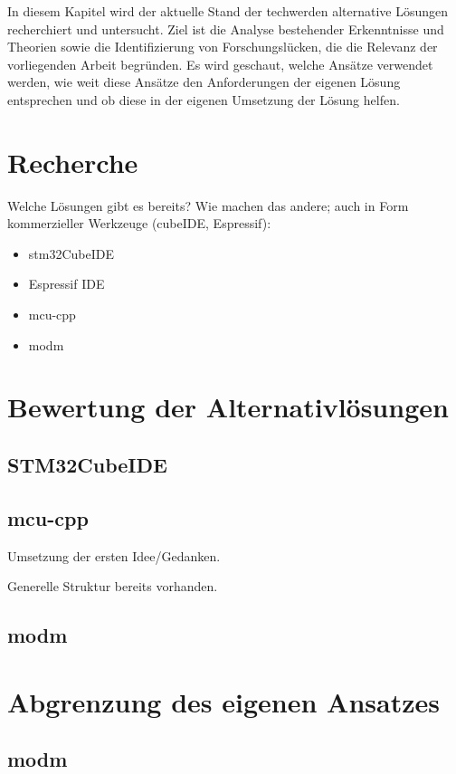 In diesem Kapitel wird der aktuelle Stand der techwerden alternative Lösungen recherchiert und untersucht.
Ziel ist die Analyse bestehender Erkenntnisse und Theorien sowie die Identifizierung von Forschungslücken, die die Relevanz der vorliegenden Arbeit begründen.
Es wird geschaut, welche Ansätze verwendet werden, wie weit diese Ansätze den Anforderungen der eigenen Lösung entsprechen und ob diese in der eigenen Umsetzung der Lösung helfen.



\section{Recherche}
Welche Lösungen gibt es bereits?
Wie machen das andere; auch in Form kommerzieller Werkzeuge (cubeIDE, Espressif):
\begin{itemize}
	\item stm32CubeIDE
	\item Espressif IDE
	\item mcu-cpp
	\item modm
\end{itemize}

\section{Bewertung der Alternativlösungen}
\subsection{STM32CubeIDE}




\subsection{mcu-cpp}
Umsetzung der ersten Idee/Gedanken.

Generelle Struktur bereits vorhanden.

\subsection{modm}


\section{Abgrenzung des eigenen Ansatzes}
\subsection{modm}


